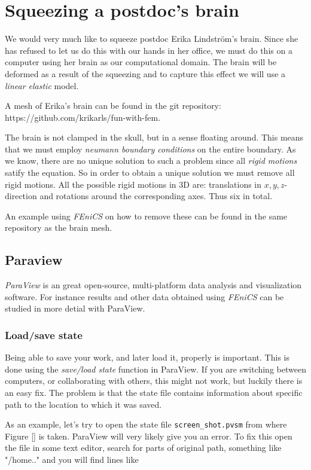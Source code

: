 \documentclass[epsfig,11pt]{article}
\begin{document}
\section{Squeezing a postdoc's brain}

We would very much like to squeeze postdoc Erika Lindström's brain. Since she has refused to let us do this with our hands in her office, we must do this on a computer using her brain as our computational domain. The brain will be deformed as a result of the squeezing and to capture this effect we will use a \emph{linear elastic} model. 

A mesh of Erika's brain can be found in the git repository:
 https://github.com/krikarls/fun-with-fem. 
 

The brain is not clamped in the skull, but in a sense floating around. This means that we must employ \emph{neumann boundary conditions} on the entire boundary. As we know, there are no unique solution to such a problem since all \emph{rigid motions} satify the equation. So in order to obtain a unique solution we must remove all rigid motions. All the possible rigid motions in 3D are: translations in $x,y,z$-direction and rotations around the corresponding axes. Thus six in total.

An example using \emph{FEniCS} on how to remove these can be found in the same repository as the brain mesh. 

\subsection{Paraview}
\emph{ParaView} is an great open-source, multi-platform data analysis and visualization software. For instance results and other data obtained using \emph{FEniCS} can be studied in more detial with ParaView.  

\subsubsection{Load/save state}

Being able to save your work, and later load it, properly is important. This is done using the \emph{save/load state} function in ParaView. If you are switching between computers, or collaborating with others, this might not work, but luckily there is an easy fix. The problem is that the state file contains information about specific path to the location to which it was saved. 

As an example, let's try to open the state file  \texttt{screen\_shot.pvsm} from where Figure [] is taken. ParaView will very likely give you an error. To fix this open the file in some text editor, search for parts of original path, something like "/home.." and you will find lines like 
\end{document}
